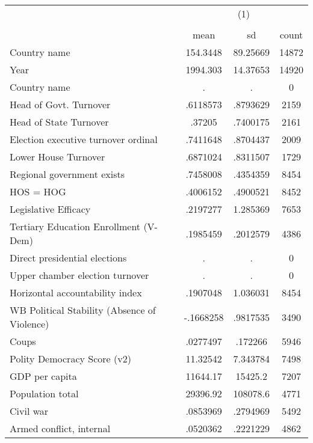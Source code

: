 {
\def\sym#1{\ifmmode^{#1}\else\(^{#1}\)\fi}
\begin{tabular}{l*{1}{ccc}}
\hline\hline
                    &\multicolumn{3}{c}{(1)}               \\
                    &\multicolumn{3}{c}{}                  \\
                    &        mean&          sd&       count\\
\hline
Country name        &    154.3448&    89.25669&       14872\\
Year                &    1994.303&    14.37653&       14920\\
Country name        &           .&           .&           0\\
Head of Govt. Turnover&    .6118573&    .8793629&        2159\\
Head of State Turnover&      .37205&    .7400175&        2161\\
Election executive turnover ordinal&    .7411648&    .8704437&        2009\\
Lower House Turnover&    .6871024&    .8311507&        1729\\
Regional government exists   &    .7458008&    .4354359&        8454\\
HOS = HOG           &    .4006152&    .4900521&        8452\\
Legislative Efficacy&    .2197277&    1.285369&        7653\\
Tertiary Education Enrollment (V-Dem)&    .1985459&    .2012579&        4386\\
Direct presidential elections&           .&           .&           0\\
Upper chamber election turnover&           .&           .&           0\\
Horizontal accountability index&    .1907048&    1.036031&        8454\\
WB Political Stability (Absence of Violence)&   -.1668258&    .9817535&        3490\\
Coups               &    .0277497&     .172266&        5946\\
Polity Democracy Score (v2)&    11.32542&    7.343784&        7498\\
GDP per capita      &    11644.17&     15425.2&        7207\\
Population total    &    29396.92&    108078.6&        4771\\
Civil war           &    .0853969&    .2794969&        5492\\
Armed conflict, internal&    .0520362&    .2221229&        4862\\

\end{tabular}}
